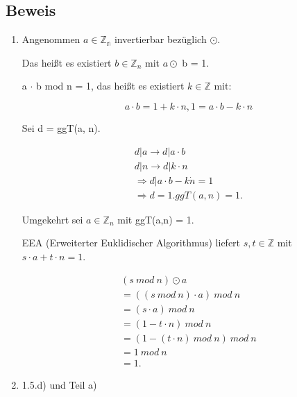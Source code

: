 \documentclass[a4paper, openany]{book}
\begin{document}
  \subsection{Beweis}

  \begin{enumerate}[label=(\alph*)]
    \item Angenommen $a \in \mathbb{Z_n}$ invertierbar bezüglich $\odot$.

    Das heißt es existiert $b \in \mathbb{Z}_n$ mit $a \odot$ b = 1. 

    a $\cdot$ b mod n = 1, das heißt es existiert $k \in \mathbb{Z}$ mit:

    \begin{equation}
      a \cdot b = 1 + k \cdot n, 1 = a \cdot b - k \cdot n
    \end{equation}

    Sei d = ggT(a, n).

    \begin{equation}
      \begin{split}
        d|a \rightarrow d | a \cdot b \\
        d|n \rightarrow d | k \cdot n \\
        \Rightarrow d|a \cdot b - k \dot n = 1 \\
        \Rightarrow d = 1.  ggT(a, n) = 1.
      \end{split}
    \end{equation}

    Umgekehrt sei $a \in \mathbb{Z}_n$ mit ggT(a,n) = 1.

    EEA (Erweiterter Euklidischer Algorithmus) liefert $s, t \in \mathbb{Z}$ mit $s \cdot a + t \cdot n = 1$.

    \begin{equation}
      \begin{split}
        (s \ mod \ n) \odot a \\
        = ((s \ mod \ n) \cdot a) \ mod \ n \\
        = (s \cdot a) \ mod \ n \\
        = (1-t \cdot n) \ mod \ n \\
        = (1-(t \cdot n) \ mod \ n) \ mod \ n \\
        = 1 \ mod \ n  \\
        = 1.
      \end{split}
    \end{equation}

    \item 1.5.d) und Teil a)

  \end{enumerate}
\end{document}
